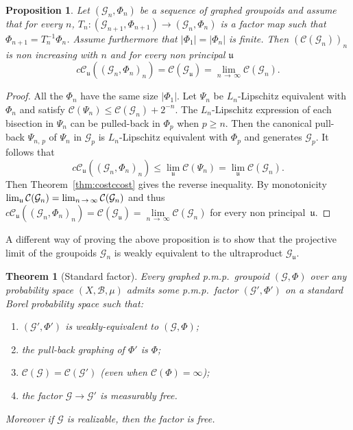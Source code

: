 \documentclass[10pt]{amsart}
\newtheorem{theo}[cdrthm]{Theorem}
\newtheorem{prop}[cdrthm]{Proposition}
\theoremstyle{definition}
\newcommand{\cost}{\mathcal{C}}
\newcommand{\ccost}{c\mathcal{C}}
\newcommand{\cg}{\mathcal{G}}
\newcommand{\rb}{\mathscr{B}}
\newcommand{\ul}{\mathfrak{u}}
\newcommand{\pmp}{p.m.p.\ }
\begin{document}
\begin{prop}\label{prop: projective limit and costs}
Let $(\cg_n,\Phi_n)$ be a sequence of graphed groupoids and assume that for every $n$, $T_n: (\cg_{n+1},\Phi_{n+1})\to (\cg_n,\Phi_n)$ is a factor map such that $\Phi_{n+1} = T_n^{-1} \Phi_n$. Assume furthermore that $|\Phi_1|=|\Phi_n|$ is finite. Then $(\cost(\cg_n))_n$ is non increasing with $n$ and for every non principal $\ul$
\[
\ccost_\ul\left(\left(\cg_n,\Phi_n\right)_n\right)=\cost(\cg_\ul)=\lim_{n\,\to\,\infty}\cost(\cg_{n}).
\]
\end{prop}
\begin{proof}
All the $\Phi_n$ have the same size $|\Phi_1|$. Let $\Psi_n$ be $L_n$-Lipschitz equivalent with $\Phi_n$ and satisfy $\cost(\Psi_n)\leq \cost(\cg_n)+2^{-n}$. The $L_n$-Lipschitz expression of each bisection in $\Psi_n$ can be pulled-back in $\Phi_p$ when $p\geq n$. Then the canonical pull-back $\Psi_{n,\,p}$ of $\Psi_n$ in $\cg_p$ is $L_n$-Lipschitz equivalent with $\Phi_p$ and generates $\cg_p$. It follows that
\[
\ccost_\ul ((\cg_n, \Phi_n)_n)\leq \lim\limits_\ul \cost(\Psi_n)=\lim\limits_{\ul} \cost (\cg_n).
\]
Then Theorem~\ref{thm:costccost} gives the reverse inequality. By monotonicity $\lim_{\ul} \cost (\cg_n)\linebreak =\lim_{n\,\to\, \infty} \cost (\cg_n)$ and thus $\ccost_\ul ((\cg_n, \Phi_n)_n)=\cost(\cg_\ul)=\lim\limits_{n\,\to\,\infty}\cost(\cg_{n})$ for every non principal~$\ul$.
\end{proof}

A different way of proving the above proposition is to show that the projective limit of the groupoids $\cg_n$ is weakly equivalent to the ultraproduct $\cg_\ul$.

\begin{theo}[Standard factor]\label{thm: standard factors}
Every graphed \pmp groupoid $(\cg, \Phi)$ over any probability space $(X,{\rb},\mu)$ admits some \pmp factor $(\cg', \Phi')$ on a standard Borel probability space such that:
\begin{enumerate}
\item \label{theo3.28.1}$(\cg', \Phi')$ is weakly-equivalent to $(\cg, \Phi)$;
\item \label{theo3.28.2}the pull-back graphing of $\Phi'$ is $\Phi$;
\item \label{theo3.28.3}$\cost(\cg)=\cost(\cg')$ (even when $\cost(\Phi)=\infty$); \label{it: standard factors, cost}
\item \label{theo3.28.4}the factor $\cg\to \cg'$ is measurably free.
\end{enumerate}

Moreover if $\cg$ is realizable, then the factor is free.
\end{theo}
\end{document}
